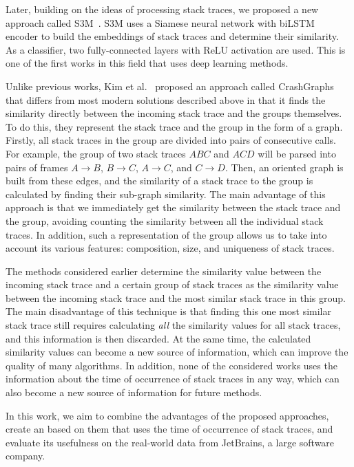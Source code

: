 Later, building on the ideas of processing stack traces, we proposed a new approach called S3M~\cite{s3m}.
S3M uses a Siamese neural network with biLSTM~\cite{lstm, bilstm} encoder to build the embeddings of stack traces and determine their similarity.
As a classifier, two fully-connected layers with ReLU activation are used. This is one of the first works in this field that uses deep learning methods.

Unlike previous works, Kim et al.~\cite{crash_graphs} proposed an approach called CrashGraphs that differs from most modern solutions described above in that it finds the similarity directly between the incoming stack trace and the groups themselves.
To do this, they represent the stack trace and the group in the form of a graph.
Firstly, all stack traces in the group are divided into pairs of consecutive calls.
For example, the group of two stack traces $ABC$ and $ACD$ will be parsed into pairs of frames $A \rightarrow B$, $B \rightarrow C$, $A \rightarrow C$, and $C \rightarrow D$.
Then, an oriented graph is built from these edges, and the similarity of a stack trace to the group is calculated by finding their sub-graph similarity. 
The main advantage of this approach is that we immediately get the similarity between the stack trace and the group, avoiding counting the similarity between all the individual stack traces.
In addition, such a representation of the group allows us to take into account its various features: composition, size, and uniqueness of stack traces.

The methods considered earlier determine the similarity value between the incoming stack trace and a certain group of stack traces as the similarity value between the incoming stack trace and the most similar stack trace in this group.
The main disadvantage of this technique is that finding this one most similar stack trace still requires calculating \textit{all} the similarity values for all stack traces, and this information is then discarded.
At the same time, the calculated similarity values can become a new source of information, which can improve the quality of many algorithms.
In addition, none of the considered works uses the information about the time of occurrence of stack traces in any way, which can also become a new source of information for future methods.

In this work, we aim to combine the advantages of the proposed approaches, create an \ag based on them that uses the time of occurrence of stack traces, and evaluate its usefulness on the real-world data from JetBrains, a large software company.

